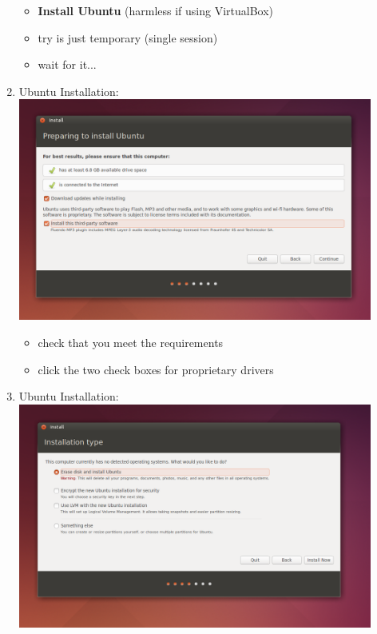 \documentclass[12pt]{article}
\begin{document}
\begin{description}
\begin{enumerate}
\begin{itemize}
                 \item {\bf Install Ubuntu} (harmless if using VirtualBox)
                 \item try is just temporary (single session)
                 \item wait for it...    
            \end{itemize}
	\newpage
\item Ubuntu Installation: \vspace{20mm} \\
      		\hspace*{-2.5cm}\includegraphics[scale=.6]{Capture11.png} 
            \begin{itemize}
                    \item check that you meet the requirements
                 \item click the two check boxes for proprietary drivers
            \end{itemize}
	\newpage
\item Ubuntu Installation: \vspace{20mm} \\
      		\hspace*{-2.5cm}\includegraphics[scale=.6]{Capture12.png}\\
             \begin{itemize}
                    

\end{itemize}
\end{enumerate}
\end{description}
\end{document}
